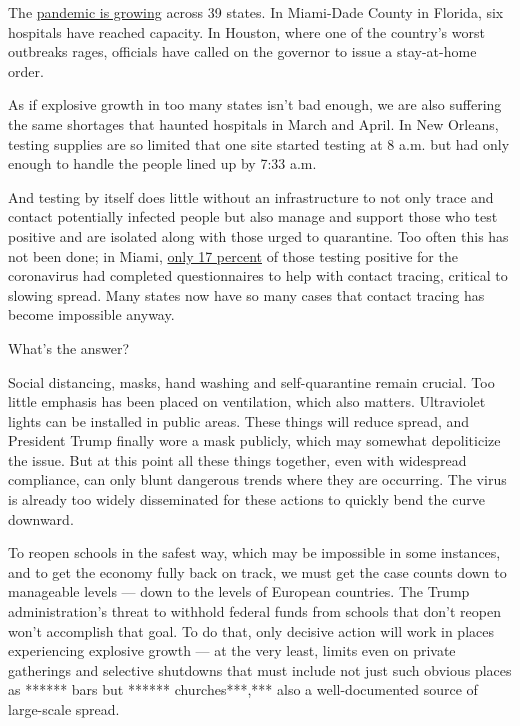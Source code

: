 The
\href{https://www.nytimes3xbfgragh.onion/interactive/2020/us/coronavirus-us-cases.html}{pandemic
is growing} across 39 states. In Miami-Dade County in Florida, six
hospitals have reached capacity. In Houston, where one of the country's
worst outbreaks rages, officials have called on the governor to issue a
stay-at-home order.

As if explosive growth in too many states isn't bad enough, we are also
suffering the same shortages that haunted hospitals in March and April.
In New Orleans, testing supplies are so limited that one site started
testing at 8 a.m. but had only enough to handle the people lined up by
7:33 a.m.

And testing by itself does little without an infrastructure to not only
trace and contact potentially infected people but also manage and
support those who test positive and are isolated along with those urged
to quarantine. Too often this has not been done; in Miami,
\href{https://miami.cbslocal.com/2020/07/09/mayors-coalition-wants-more-contact-tracers-miami-dade-county/}{only
17 percent} of those testing positive for the coronavirus had completed
questionnaires to help with contact tracing, critical to slowing spread.
Many states now have so many cases that contact tracing has become
impossible anyway.

What's the answer?

Social distancing, masks, hand washing and self-quarantine remain
crucial. Too little emphasis has been placed on ventilation, which also
matters. Ultraviolet lights can be installed in public areas. These
things will reduce spread, and President Trump finally wore a mask
publicly, which may somewhat depoliticize the issue. But at this point
all these things together, even with widespread compliance, can only
blunt dangerous trends where they are occurring. The virus is already
too widely disseminated for these actions to quickly bend the curve
downward.

To reopen schools in the safest way, which may be impossible in some
instances, and to get the economy fully back on track, we must get the
case counts down to manageable levels --- down to the levels of European
countries. The Trump administration's threat to withhold federal funds
from schools that don't reopen won't accomplish that goal. To do that,
only decisive action will work in places experiencing explosive growth
--- at the very least, limits even on private gatherings and selective
shutdowns that must include not just such obvious places as ****** bars
but ****** churches***,*** also a well-documented source of large-scale
spread.

